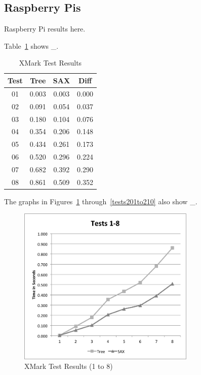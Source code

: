 \documentclass{acm_proc_article-sp}
\begin{document}
\subsection{Raspberry Pis}
Raspberry Pi results here.

Table~\ref{xmarkTable} shows \_.

\begin{table}[tbp]
\centering
\caption{XMark Test Results}
\label{xmarkTable}
\begin{tabular}{ c || c | c | c }

	Test & Tree & SAX & Diff\\ \hline
	01 & 0.003 & 0.003 & 0.000 \\
	02 & 0.091 & 0.054 & 0.037 \\
	03 & 0.180 & 0.104 & 0.076 \\
	04 & 0.354 & 0.206 & 0.148 \\
	05 & 0.434 & 0.261 & 0.173 \\
	06 & 0.520 & 0.296 & 0.224 \\
	07 & 0.682 & 0.392 & 0.290 \\
	08 & 0.861 & 0.509 & 0.352 \\
\end{tabular}
\end{table}

The graphs in Figures~\ref{tests001to008} through~\ref{tests201to210} also show \_.

\begin{figure}[tbp]
  \centering
  \caption{XMark Test Results (1 to 8)}
	\label{tests001to008}
  \includegraphics[width=20pc]{Tests001to008.png}
\end{figure}
\end{document}
